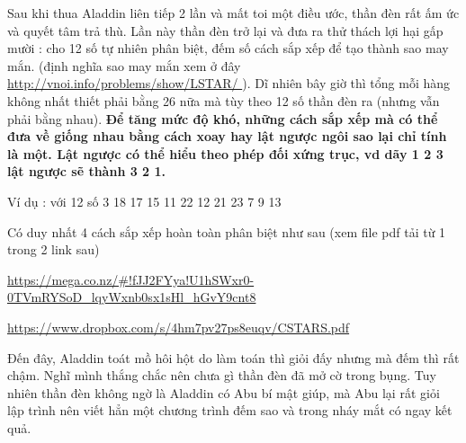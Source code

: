 Sau khi thua Aladdin liên tiếp 2 lần và mất toi một điều ước, thần đèn rất ấm ức và quyết tâm trả thù. Lần này thần đèn trở lại và đưa ra thử thách lợi hại gấp mười : cho 12 số tự nhiên phân biệt, đếm số cách sắp xếp để tạo thành sao may mắn. (định nghĩa sao may mắn xem ở đây \href{http://vnoi.info/problems/show/LSTAR/}{ http://vnoi.info/problems/show/LSTAR/ } ). Dĩ nhiên bây giờ thì tổng mỗi hàng không nhất thiết phải bằng 26 nữa mà tùy theo 12 số thần đèn ra (nhưng vẫn phải bằng nhau). \textbf{ Để tăng mức độ khó, những cách sắp xếp mà có thể đưa về giống nhau bằng cách xoay hay lật ngược ngôi sao lại chỉ tính là một. Lật ngược có thể hiểu theo phép đối xứng trục, vd dãy 1 2 3 lật ngược sẽ thành 3 2 1. }

Ví dụ : với 12 số 3 18 17 15 11 22 12 21 23 7 9 13

Có duy nhất 4 cách sắp xếp hoàn toàn phân biệt như sau (xem file pdf tải từ 1 trong 2 link sau)

\href{https://mega.co.nz/#!fJJ2FYya!U1hSWxr0-0TVmRYSoD_lqyWxnb0sx1sHl_hGvY9cnt8}{https://mega.co.nz/\#!fJJ2FYya!U1hSWxr0-0TVmRYSoD\_lqyWxnb0sx1sHl\_hGvY9cnt8 }

\href{https://www.dropbox.com/s/4hm7pv27ps8euqv/CSTARS.pdf}{https://www.dropbox.com/s/4hm7pv27ps8euqv/CSTARS.pdf }

Đến đây, Aladdin toát mồ hôi hột do làm toán thì giỏi đấy nhưng mà đếm thì rất chậm. Nghĩ mình thắng chắc nên chưa gì thần đèn đã mở cờ trong bụng. Tuy nhiên thần đèn không ngờ là Aladdin có Abu bí mật giúp, mà Abu lại rất giỏi lập trình nên viết hẳn một chương trình đếm sao và trong nháy mắt có ngay kết quả.

\